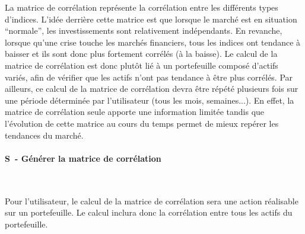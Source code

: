 \documentclass[a4paper]{report}
\newcommand\specification[1]{\addtocounter{cptspec}{1}\paragraph{S\thecptspec ~-  #1}~\par}
\newcounter{cptspec}
\begin{document}
La matrice de corrélation représente la corrélation entre les différents types d’indices.
L’idée derrière cette matrice est que lorsque le marché est en situation “normale”, les investissements sont relativement indépendants.
En revanche, lorsque qu’une crise touche les marchés financiers, tous les indices ont tendance à baisser et ils sont donc plus fortement corrélés (à la baisse).
Le calcul de la matrice de corrélation est donc plutôt lié à un portefeuille composé d’actifs variés, afin de vérifier que les actifs n'ont pas tendance à être plus corrélés.
Par ailleurs, ce calcul de la matrice de corrélation devra être répété plusieurs fois sur une période déterminée par l’utilisateur (tous les mois, semaines...).
En effet, la matrice de corrélation seule apporte une information limitée tandis que l’évolution de cette matrice au cours du temps permet de mieux repérer les tendances du marché.

\specification{Générer la matrice de corrélation}

Pour l’utilisateur, le calcul de la matrice de corrélation sera une action réalisable sur un portefeuille.
Le calcul inclura donc la corrélation entre tous les actifs du portefeuille.
\end{document}
